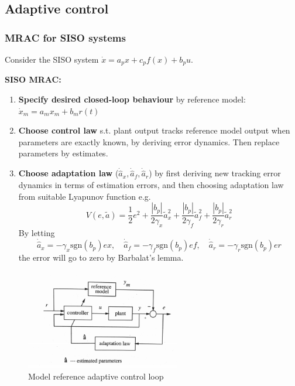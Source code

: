 \subsection{Adaptive control}
\subsubsection{MRAC for SISO systems}
Consider the SISO system $\dot{x} = a_p x + c_p f(x) + b_p u$.
\begin{tcolorbox}[colback=white, colframe=teal]
    \textbf{SISO MRAC:}
    \begin{enumerate}
    \item \textbf{Specify desired closed-loop behaviour} by reference model:
        $\dot{x}_m = a_m x_m + b_m r(t)$
    \item \textbf{Choose control law} s.t. plant output tracks reference model output when parameters are exactly known, by deriving error dynamics. Then replace parameters by estimates. 
    \item \textbf{Choose adaptation law} ($\dot{\hat{a}}_x, \dot{\hat{a}}_f, \dot{\hat{a}}_r$) by first deriving new tracking error dynamics in terms of estimation errors, and then choosing adaptation law from suitable Lyapunov function e.g.
    \begin{equation}
        V(e, \tilde{a}) = \frac{1}{2}e^2 + \frac{|b_p|}{2\gamma_x}\tilde{a}_x^2 +\frac{|b_p|}{2\gamma_f}\tilde{a}_f^2 +\frac{|b_p|}{2\gamma_r}\tilde{a}_r^2
    \end{equation}
    By letting
    \begin{equation}
        \dot{\hat{a}}_x = - \gamma_x \text{sgn}(b_p)ex, \quad \dot{\hat{a}}_f = - \gamma_f \text{sgn}(b_p)ef, \quad \dot{\hat{a}}_r = - \gamma_r \text{sgn}(b_p)er
    \end{equation}
    the error will go to zero by Barbalat's lemma.
\end{enumerate}
\end{tcolorbox}

\begin{figure}[!htb]
    \includegraphics[width = 0.6\textwidth]{figures/mrac.png}
    \caption{Model reference adaptive control loop}
\end{figure}

